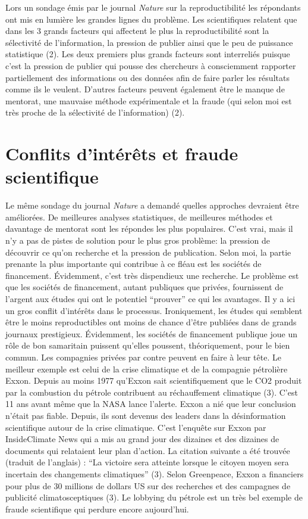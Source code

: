 \documentclass[9pt,twocolumn,twoside,]{pnas-new}
\begin{document}
Lors un sondage émis par le journal \emph{Nature} sur la
reproductibilité les répondants ont mis en lumière les grandes lignes du
problème. Les scientifiques relatent que dans les 3 grands facteurs qui
affectent le plus la reproductibilité sont la sélectivité de
l'information, la pression de publier ainsi que le peu de puissance
statistique (2). Les deux premiers plus grands facteurs sont interreliés
puisque c'est la pression de publier qui pousse des chercheurs à
consciemment rapporter partiellement des informations ou des données
afin de faire parler les résultats comme ils le veulent. D'autres
facteurs peuvent également être le manque de mentorat, une mauvaise
méthode expérimentale et la fraude (qui selon moi est très proche de la
sélectivité de l'information) (2).

\hypertarget{conflits-dintuxe9ruxeats-et-fraude-scientifique}{%
\section{Conflits d'intérêts et fraude
scientifique}\label{conflits-dintuxe9ruxeats-et-fraude-scientifique}}

Le même sondage du journal \emph{Nature} a demandé quelles approches
devraient être améliorées. De meilleures analyses statistiques, de
meilleures méthodes et davantage de mentorat sont les répondes les plus
populaires. C'est vrai, mais il n'y a pas de pistes de solution pour le
plus gros problème: la pression de découvrir ce qu'on recherche et la
pression de publication. Selon moi, la partie prenante la plus
importante qui contribue à ce fléau est les sociétés de financement.
Évidemment, c'est très dispendieux une recherche. Le problème est que
les sociétés de financement, autant publiques que privées, fournissent
de l'argent aux études qui ont le potentiel ``prouver'' ce qui les
avantages. Il y a ici un gros conflit d'intérêts dans le processus.
Ironiquement, les études qui semblent être le moins reproductibles ont
moins de chance d'être publiées dans de grands journaux prestigieux.
Évidemment, les sociétés de financement publique joue un rôle de bon
samaritain puissent qu'elles poussent, théoriquement, pour le bien
commun. Les compagnies privées par contre peuvent en faire à leur tête.
Le meilleur exemple est celui de la crise climatique et de la compagnie
pétrolière Exxon. Depuis au moins 1977 qu'Exxon sait scientifiquement
que le CO2 produit par la combustion du pétrole contribuent au
réchauffement climatique (3). C'est 11 ans avant même que la NASA lance
l'alerte. Exxon a nié que leur conclusion n'était pas fiable. Depuis,
ils sont devenus des leaders dans la désinformation scientifique autour
de la crise climatique. C'est l'enquête sur Exxon par InsideClimate News
qui a mis au grand jour des dizaines et des dizaines de documents qui
relataient leur plan d'action. La citation suivante a été trouvée
(traduit de l'anglais) : ``La victoire sera atteinte lorsque le citoyen
moyen sera incertain des changements climatiques'' (3). Selon
Greenpeace, Exxon a financiers pour plus de 30 millions de dollars US
sur des recherches et des campagnes de publicité climatosceptiques (3).
Le lobbying du pétrole est un très bel exemple de fraude scientifique
qui perdure encore aujourd'hui.
\end{document}
